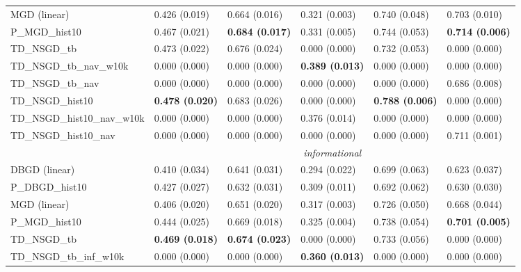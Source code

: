 \begin{tabular*}{\textwidth}{@{\extracolsep{\fill} } l  l l l l l  }
MGD (linear) & 0.426 {\tiny (0.019)} & 0.664 {\tiny (0.016)} & 0.321 {\tiny (0.003)} & 0.740 {\tiny (0.048)} & 0.703 {\tiny (0.010)} \\
P\_MGD\_hist10 & 0.467 {\tiny (0.021)} & \bf 0.684 {\tiny (0.017)} & 0.331 {\tiny (0.005)} & 0.744 {\tiny (0.053)} & \bf 0.714 {\tiny (0.006)} \\
TD\_NSGD\_tb & 0.473 {\tiny (0.022)} & 0.676 {\tiny (0.024)} & 0.000 {\tiny (0.000)} & 0.732 {\tiny (0.053)} & 0.000 {\tiny (0.000)} \\
TD\_NSGD\_tb\_nav\_w10k & 0.000 {\tiny (0.000)} & 0.000 {\tiny (0.000)} & \bf 0.389 {\tiny (0.013)} & 0.000 {\tiny (0.000)} & 0.000 {\tiny (0.000)} \\
TD\_NSGD\_tb\_nav & 0.000 {\tiny (0.000)} & 0.000 {\tiny (0.000)} & 0.000 {\tiny (0.000)} & 0.000 {\tiny (0.000)} & 0.686 {\tiny (0.008)} \\
TD\_NSGD\_hist10 & \bf 0.478 {\tiny (0.020)} & 0.683 {\tiny (0.026)} & 0.000 {\tiny (0.000)} & \bf 0.788 {\tiny (0.006)} & 0.000 {\tiny (0.000)} \\
TD\_NSGD\_hist10\_nav\_w10k & 0.000 {\tiny (0.000)} & 0.000 {\tiny (0.000)} & 0.376 {\tiny (0.014)} & 0.000 {\tiny (0.000)} & 0.000 {\tiny (0.000)} \\
TD\_NSGD\_hist10\_nav & 0.000 {\tiny (0.000)} & 0.000 {\tiny (0.000)} & 0.000 {\tiny (0.000)} & 0.000 {\tiny (0.000)} & 0.711 {\tiny (0.001)} \\
\midrule
& \multicolumn{5}{|c|}{\textit{informational}} \\
\midrule
DBGD (linear) & 0.410 {\tiny (0.034)} & 0.641 {\tiny (0.031)} & 0.294 {\tiny (0.022)} & 0.699 {\tiny (0.063)} & 0.623 {\tiny (0.037)} \\
P\_DBGD\_hist10 & 0.427 {\tiny (0.027)} & 0.632 {\tiny (0.031)} & 0.309 {\tiny (0.011)} & 0.692 {\tiny (0.062)} & 0.630 {\tiny (0.030)} \\
MGD (linear) & 0.406 {\tiny (0.020)} & 0.651 {\tiny (0.020)} & 0.317 {\tiny (0.003)} & 0.726 {\tiny (0.050)} & 0.668 {\tiny (0.044)} \\
P\_MGD\_hist10 & 0.444 {\tiny (0.025)} & 0.669 {\tiny (0.018)} & 0.325 {\tiny (0.004)} & 0.738 {\tiny (0.054)} & \bf 0.701 {\tiny (0.005)} \\
TD\_NSGD\_tb & \bf 0.469 {\tiny (0.018)} & \bf 0.674 {\tiny (0.023)} & 0.000 {\tiny (0.000)} & 0.733 {\tiny (0.056)} & 0.000 {\tiny (0.000)} \\
TD\_NSGD\_tb\_inf\_w10k & 0.000 {\tiny (0.000)} & 0.000 {\tiny (0.000)} & \bf 0.360 {\tiny (0.013)} & 0.000 {\tiny (0.000)} & 0.000 {\tiny (0.000)} \\

\end{tabular*}
